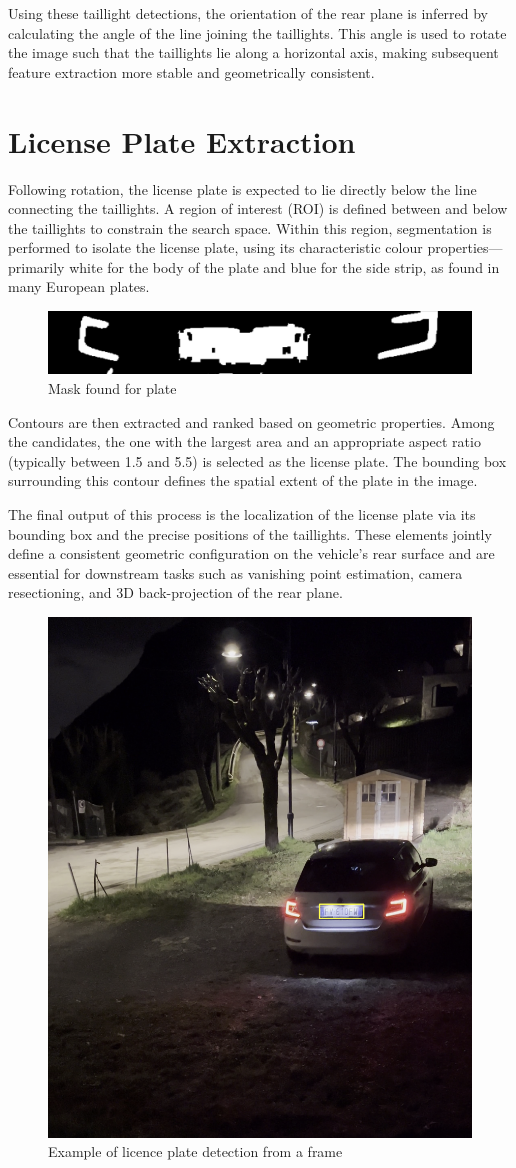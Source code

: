 Using these taillight detections, the orientation of the rear plane is inferred by calculating the angle of the line joining the taillights. This angle is used to rotate the image such that the taillights lie along a horizontal axis, making subsequent feature extraction more stable and geometrically consistent.

\section{License Plate Extraction}
Following rotation, the license plate is expected to lie directly below the line connecting the taillights. A region of interest (ROI) is defined between and below the taillights to constrain the search space. Within this region, segmentation is performed to isolate the license plate, using its characteristic colour properties—primarily white for the body of the plate and blue for the side strip, as found in many European plates.

\begin{figure}[htbp]
    \centering
    \includegraphics[width=0.5\linewidth]{Images//featureExtractions/plateMask.png}
    \caption{Mask found for plate}
    \label{fig:plateMask}
\end{figure}

Contours are then extracted and ranked based on geometric properties. Among the candidates, the one with the largest area and an appropriate aspect ratio (typically between 1.5 and 5.5) is selected as the license plate. The bounding box surrounding this contour defines the spatial extent of the plate in the image.

The final output of this process is the localization of the license plate via its bounding box and the precise positions of the taillights. These elements jointly define a consistent geometric configuration on the vehicle’s rear surface and are essential for downstream tasks such as vanishing point estimation, camera resectioning, and 3D back-projection of the rear plane.

\begin{figure}[htbp]
    \centering
    \includegraphics[width=0.4\linewidth]{Images/licenceDetection1.png}
    \caption{Example of licence plate detection from a frame}
    \label{fig:licenceDetection}
\end{figure}

